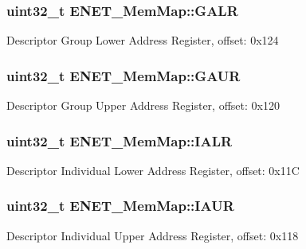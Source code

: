 \subsubsection[{G\+A\+L\+R}]{\setlength{\rightskip}{0pt plus 5cm}uint32\+\_\+t E\+N\+E\+T\+\_\+\+Mem\+Map\+::\+G\+A\+L\+R}\label{struct_e_n_e_t___mem_map_a66dd66dae8c45fd2658eec6ea05dd7dd}
Descriptor Group Lower Address Register, offset\+: 0x124 \hypertarget{struct_e_n_e_t___mem_map_a3806bd6a5c25e5430abb853b48598b4e}{}
\subsubsection[{G\+A\+U\+R}]{\setlength{\rightskip}{0pt plus 5cm}uint32\+\_\+t E\+N\+E\+T\+\_\+\+Mem\+Map\+::\+G\+A\+U\+R}\label{struct_e_n_e_t___mem_map_a3806bd6a5c25e5430abb853b48598b4e}
Descriptor Group Upper Address Register, offset\+: 0x120 \hypertarget{struct_e_n_e_t___mem_map_a335c5db5d82d1fa32d63ab09d1e81a9f}{}
\subsubsection[{I\+A\+L\+R}]{\setlength{\rightskip}{0pt plus 5cm}uint32\+\_\+t E\+N\+E\+T\+\_\+\+Mem\+Map\+::\+I\+A\+L\+R}\label{struct_e_n_e_t___mem_map_a335c5db5d82d1fa32d63ab09d1e81a9f}
Descriptor Individual Lower Address Register, offset\+: 0x11\+C \hypertarget{struct_e_n_e_t___mem_map_a78ae9799517092522b6fc5da4c66370a}{}
\subsubsection[{I\+A\+U\+R}]{\setlength{\rightskip}{0pt plus 5cm}uint32\+\_\+t E\+N\+E\+T\+\_\+\+Mem\+Map\+::\+I\+A\+U\+R}\label{struct_e_n_e_t___mem_map_a78ae9799517092522b6fc5da4c66370a}
Descriptor Individual Upper Address Register, offset\+: 0x118 \hypertarget{struct_e_n_e_t___mem_map_a039b0879213c4f8df06320fd59ec98b5}{}
